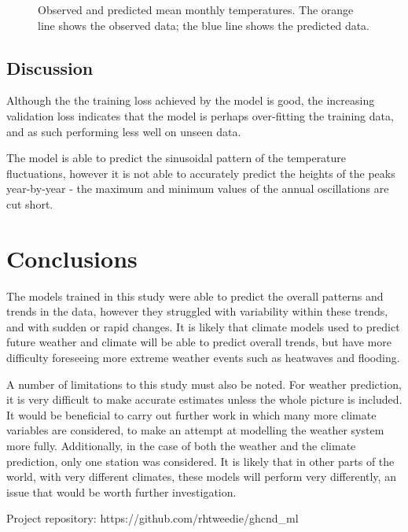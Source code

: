 \documentclass[12pt]{article}
\begin{document}
    \begin{figure}
        \centering
        
        \caption{Observed and predicted mean monthly temperatures. The orange line shows the observed data; the blue line shows the predicted data.}
        \label{fig:climate_prediction}
    \end{figure}

\subsection{Discussion}

     Although the the training loss achieved by the model is good, the increasing validation loss indicates that the model is perhaps over-fitting the training data, and as such performing less well on unseen data.

     The model is able to predict the sinusoidal pattern of the temperature fluctuations, however it is not able to accurately predict the heights of the peaks year-by-year - the maximum and minimum values of the annual oscillations are cut short. 
     
\section{Conclusions}

    The models trained in this study were able to predict the overall patterns and trends in the data, however they struggled with variability within these trends, and with sudden or rapid changes. It is likely that climate models used to predict future weather and climate will be able to predict overall trends, but have more difficulty foreseeing more extreme weather events such as heatwaves and flooding.

    A number of limitations to this study must also be noted. For weather prediction, it is very difficult to make accurate estimates unless the whole picture is included. It would be beneficial to carry out further work in which many more climate variables are considered, to make an attempt at modelling the weather system more fully. Additionally, in the case of both the weather and the climate prediction, only one station was considered. It is likely that in other parts of the world, with very different climates, these models will perform very differently, an issue that would be worth further investigation.


\vspace{15pt}    
\noindent Project repository: https://github.com/rhtweedie/ghcnd\_ml

\printbibliography
\end{document}
